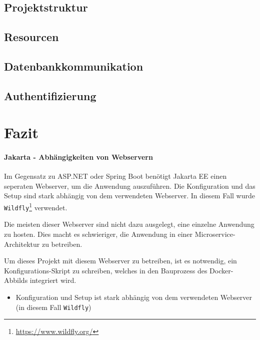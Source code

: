 \subsection{Projektstruktur}

\subsection{Resourcen}

\subsection{Datenbankkommunikation}

\subsection{Authentifizierung}


\section{Fazit}

\paragraph{Jakarta - Abhängigkeiten von Webservern}

Im Gegensatz zu ASP.NET oder Spring Boot benötigt Jakarta EE einen seperaten Webserver, um die Anwendung auszuführen. 
Die Konfiguration und das Setup sind stark abhängig von dem verwendeten Webserver. 
In diesem Fall wurde \texttt{Wildfly}\footnote{\url{https://www.wildfly.org/}} verwendet.

Die meisten dieser Webserver sind nicht dazu ausgelegt, eine einzelne Anwendung zu hosten.
Dies macht es schwieriger, die Anwendung in einer Microservice-Architektur zu betreiben.

Um dieses Projekt mit diesem Webserver zu betreiben, ist es notwendig, ein Konfigurations-Skript zu schreiben, welches in den Bauprozess des Docker-Abbilds integriert wird.

\begin{itemize}
    \item Konfiguration und Setup ist stark abhängig von dem verwendeten Webserver (in diesem Fall \texttt{Wildfly})
\end{itemize}

